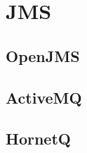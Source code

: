 \appendix
	\hypertarget{hypertarget:appendix}{}

	\chapter{JMS}
		\section{OpenJMS}
		\section{ActiveMQ}
		\section{HornetQ}